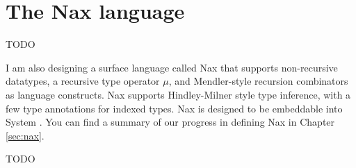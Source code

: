 \chapter{The Nax language}\label{ch:nax} TODO

I am also designing a surface language called Nax that supports
non-recursive datatypes, a recursive type operator $\mu$, and
Mendler-style recursion combinators as language constructs.
Nax supports Hindley-Milner style type inference, with a few type annotations
for indexed types. Nax is designed to be embeddable into System \Fi.
You can find a summary of our progress in defining Nax in Chapter \ref{sec:nax}.


TODO
